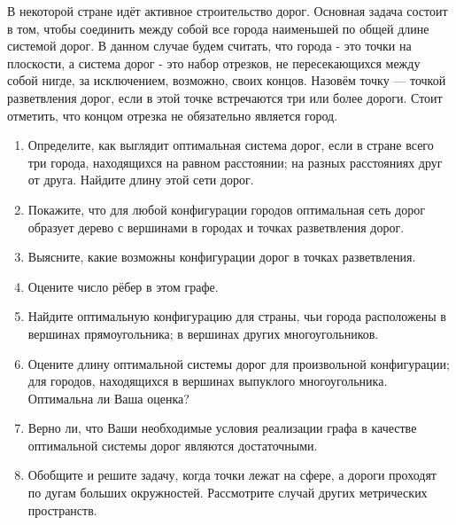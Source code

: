 В некоторой стране идёт активное строительство дорог. Основная задача состоит в том, чтобы соединить между собой все города наименьшей по общей длине системой дорог.
В данном случае будем считать, что города - это точки на плоскости, а система дорог - это набор отрезков, не пересекающихся между собой нигде, за исключением, возможно, своих концов. Назовём точку --- точкой разветвления дорог, если в этой точке встречаются три или более дороги. Стоит отметить, что концом отрезка не обязательно является город.
\begin{enumerate}
\item Определите, как выглядит оптимальная система дорог, если в стране всего три города, находящихся на равном расстоянии; на разных расстояниях друг от друга. Найдите длину этой сети дорог.
\item Покажите, что для любой конфигурации городов оптимальная сеть дорог образует дерево с вершинами в городах и точках разветвления дорог.
\item Выясните, какие возможны конфигурации дорог в точках разветвления.
\item Оцените число рёбер в этом графе.
\item Найдите оптимальную конфигурацию для страны, чьи города расположены в вершинах прямоугольника; в вершинах других многоугольников.
\item Оцените длину оптимальной системы дорог для произвольной конфигурации; для городов, находящихся в вершинах выпуклого многоугольника. Оптимальна ли Ваша оценка?
\item Верно ли, что Ваши необходимые условия  реализации графа в качестве оптимальной системы дорог являются достаточными.
\item Обобщите и решите задачу, когда точки лежат на сфере, а дороги проходят по дугам больших окружностей. Рассмотрите случай других метрических пространств.
\end{enumerate}



